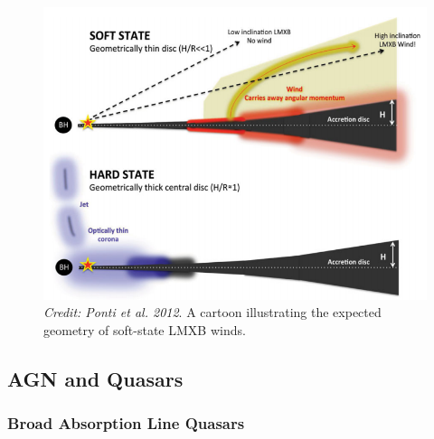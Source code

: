 \begin{figure}
\centering
\includegraphics[width=1.0\textwidth]{figures/01-intro/ponti_wind_cartoon.png}
\caption
{
{\sl Credit: Ponti et al. 2012}. 
A cartoon illustrating the expected geometry of soft-state LMXB winds.
} 
\label{fig:ponti_hid}
\end{figure}


\subsection{AGN and Quasars}
\label{sec:agn_winds}

\subsubsection{Broad Absorption Line Quasars}

